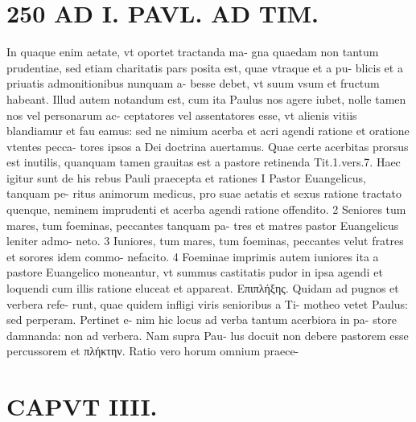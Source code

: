 \documentclass{article}
\begin{document}
\begin{pages}
\section*{250 AD I. PAVL. AD TIM. }\pstart In quaque enim aetate, vt oportet tractanda ma- gna quaedam non tantum prudentiae, sed etiam charitatis pars posita est, quae vtraque et a pu- blicis et a priuatis admonitionibus nunquam a- besse debet, vt suum vsum et fructum habeant. Illud autem notandum est, cum ita Paulus nos agere iubet, nolle tamen nos vel personarum ac- ceptatores vel assentatores esse, vt alienis vitiis blandiamur et fau eamus: sed ne nimium acerba et acri agendi ratione et oratione vtentes pecca- tores ipsos a Dei doctrina auertamus. Quae certe acerbitas prorsus est inutilis, quanquam tamen grauitas est a pastore retinenda Tit.1.vers.7. Haec igitur sunt de his rebus Pauli praecepta et rationes I Pastor Euangelicus, tanquam pe- ritus animorum medicus, pro suae aetatis et sexus ratione tractato quenque, neminem imprudenti et acerba agendi ratione offendito. 2 Seniores tum mares, tum foeminas, peccantes tanquam pa- tres et matres pastor Euangelicus leniter admo- neto. 3 Iuniores, tum mares, tum foeminas, peccantes velut fratres et sorores idem commo- nefacito. 4 Foeminae imprimis autem iuniores ita a pastore Euangelico moneantur, vt summus castitatis pudor in ipsa agendi et loquendi cum illis ratione eluceat et appareat. Επιπλήξης. Quidam ad pugnos et verbera refe- runt, quae quidem infligi viris senioribus a Ti- motheo vetet Paulus: sed perperam. Pertinet e- nim hic locus ad verba tantum acerbiora in pa- store damnanda: non ad verbera. Nam supra Pau- lus docuit non debere pastorem esse percussorem et πλήκτην. Ratio vero horum omnium praece-  \pend
\section*{CAPVT  IIII. }
\marginpar{[ p.251 ]}\pstart {}
{}

\end{pages}
\end{document}
